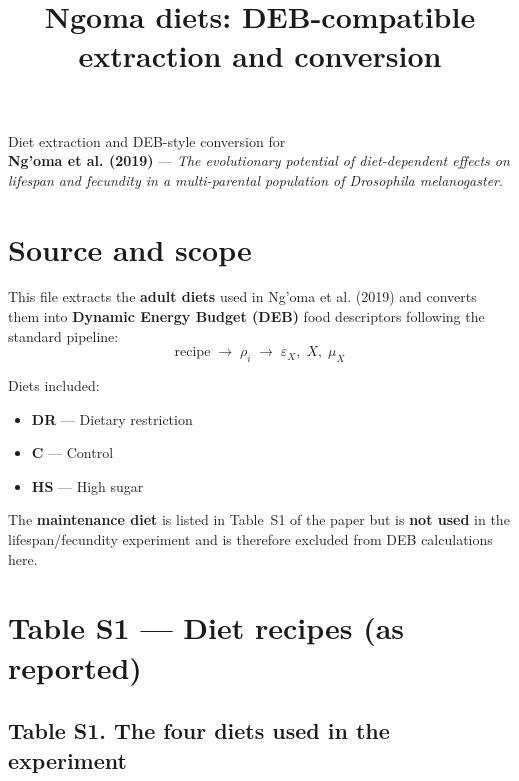 \documentclass[11pt]{article}
\title{Ngoma diets: DEB-compatible extraction and conversion}
\author{}
\date{}
\begin{document}
\maketitle

Diet extraction and DEB-style conversion for \\ \textbf{Ng'oma et al. (2019)} --- \emph{The evolutionary potential of diet-dependent effects on lifespan and fecundity in a multi-parental population of Drosophila melanogaster}.

\section{Source and scope}

This file extracts the \textbf{adult diets} used in Ng'oma et al. (2019) and converts them into \textbf{Dynamic Energy Budget (DEB)} food descriptors following the standard pipeline:
\[
  \text{recipe} \;\rightarrow\; \rho_i \;\rightarrow\; \varepsilon_X,\; X,\; \mu_X
\]

Diets included:
\begin{itemize}
  \item \textbf{DR} --- Dietary restriction
  \item \textbf{C} --- Control
  \item \textbf{HS} --- High sugar
\end{itemize}

The \textbf{maintenance diet} is listed in Table~S1 of the paper but is \textbf{not used} in the lifespan/fecundity experiment and is therefore excluded from DEB calculations here.

\section{Table S1 --- Diet recipes (as reported)}

\subsection*{Table S1. The four diets used in the experiment}
\end{document}

